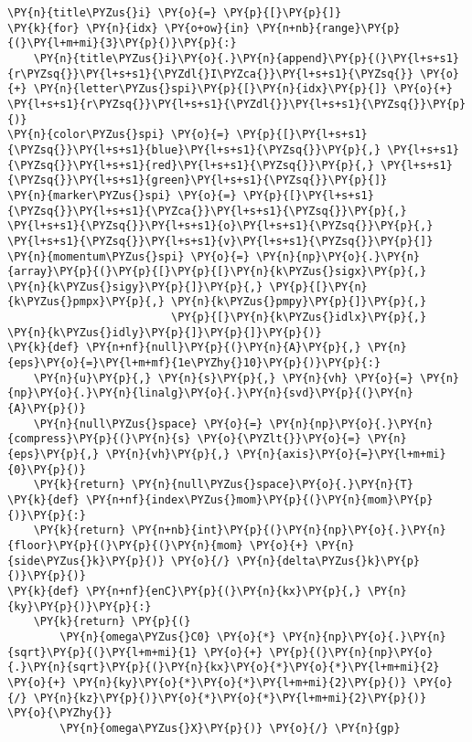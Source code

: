 \begin{Verbatim}[commandchars=\\\{\}]
\PY{n}{title\PYZus{}i} \PY{o}{=} \PY{p}{[}\PY{p}{]}
\PY{k}{for} \PY{n}{idx} \PY{o+ow}{in} \PY{n+nb}{range}\PY{p}{(}\PY{l+m+mi}{3}\PY{p}{)}\PY{p}{:}
    \PY{n}{title\PYZus{}i}\PY{o}{.}\PY{n}{append}\PY{p}{(}\PY{l+s+s1}{r\PYZsq{}}\PY{l+s+s1}{\PYZdl{}I\PYZca{}}\PY{l+s+s1}{\PYZsq{}} \PY{o}{+} \PY{n}{letter\PYZus{}spi}\PY{p}{[}\PY{n}{idx}\PY{p}{]} \PY{o}{+} \PY{l+s+s1}{r\PYZsq{}}\PY{l+s+s1}{\PYZdl{}}\PY{l+s+s1}{\PYZsq{}}\PY{p}{)}
\PY{n}{color\PYZus{}spi} \PY{o}{=} \PY{p}{[}\PY{l+s+s1}{\PYZsq{}}\PY{l+s+s1}{blue}\PY{l+s+s1}{\PYZsq{}}\PY{p}{,} \PY{l+s+s1}{\PYZsq{}}\PY{l+s+s1}{red}\PY{l+s+s1}{\PYZsq{}}\PY{p}{,} \PY{l+s+s1}{\PYZsq{}}\PY{l+s+s1}{green}\PY{l+s+s1}{\PYZsq{}}\PY{p}{]}
\PY{n}{marker\PYZus{}spi} \PY{o}{=} \PY{p}{[}\PY{l+s+s1}{\PYZsq{}}\PY{l+s+s1}{\PYZca{}}\PY{l+s+s1}{\PYZsq{}}\PY{p}{,} \PY{l+s+s1}{\PYZsq{}}\PY{l+s+s1}{o}\PY{l+s+s1}{\PYZsq{}}\PY{p}{,} \PY{l+s+s1}{\PYZsq{}}\PY{l+s+s1}{v}\PY{l+s+s1}{\PYZsq{}}\PY{p}{]}
\PY{n}{momentum\PYZus{}spi} \PY{o}{=} \PY{n}{np}\PY{o}{.}\PY{n}{array}\PY{p}{(}\PY{p}{[}\PY{p}{[}\PY{n}{k\PYZus{}sigx}\PY{p}{,} \PY{n}{k\PYZus{}sigy}\PY{p}{]}\PY{p}{,} \PY{p}{[}\PY{n}{k\PYZus{}pmpx}\PY{p}{,} \PY{n}{k\PYZus{}pmpy}\PY{p}{]}\PY{p}{,}
                         \PY{p}{[}\PY{n}{k\PYZus{}idlx}\PY{p}{,} \PY{n}{k\PYZus{}idly}\PY{p}{]}\PY{p}{]}\PY{p}{)}
\PY{k}{def} \PY{n+nf}{null}\PY{p}{(}\PY{n}{A}\PY{p}{,} \PY{n}{eps}\PY{o}{=}\PY{l+m+mf}{1e\PYZhy{}10}\PY{p}{)}\PY{p}{:}
    \PY{n}{u}\PY{p}{,} \PY{n}{s}\PY{p}{,} \PY{n}{vh} \PY{o}{=} \PY{n}{np}\PY{o}{.}\PY{n}{linalg}\PY{o}{.}\PY{n}{svd}\PY{p}{(}\PY{n}{A}\PY{p}{)}
    \PY{n}{null\PYZus{}space} \PY{o}{=} \PY{n}{np}\PY{o}{.}\PY{n}{compress}\PY{p}{(}\PY{n}{s} \PY{o}{\PYZlt{}}\PY{o}{=} \PY{n}{eps}\PY{p}{,} \PY{n}{vh}\PY{p}{,} \PY{n}{axis}\PY{o}{=}\PY{l+m+mi}{0}\PY{p}{)}
    \PY{k}{return} \PY{n}{null\PYZus{}space}\PY{o}{.}\PY{n}{T}
\PY{k}{def} \PY{n+nf}{index\PYZus{}mom}\PY{p}{(}\PY{n}{mom}\PY{p}{)}\PY{p}{:}
    \PY{k}{return} \PY{n+nb}{int}\PY{p}{(}\PY{n}{np}\PY{o}{.}\PY{n}{floor}\PY{p}{(}\PY{p}{(}\PY{n}{mom} \PY{o}{+} \PY{n}{side\PYZus{}k}\PY{p}{)} \PY{o}{/} \PY{n}{delta\PYZus{}k}\PY{p}{)}\PY{p}{)}
\PY{k}{def} \PY{n+nf}{enC}\PY{p}{(}\PY{n}{kx}\PY{p}{,} \PY{n}{ky}\PY{p}{)}\PY{p}{:}
    \PY{k}{return} \PY{p}{(}
        \PY{n}{omega\PYZus{}C0} \PY{o}{*} \PY{n}{np}\PY{o}{.}\PY{n}{sqrt}\PY{p}{(}\PY{l+m+mi}{1} \PY{o}{+} \PY{p}{(}\PY{n}{np}\PY{o}{.}\PY{n}{sqrt}\PY{p}{(}\PY{n}{kx}\PY{o}{*}\PY{o}{*}\PY{l+m+mi}{2} \PY{o}{+} \PY{n}{ky}\PY{o}{*}\PY{o}{*}\PY{l+m+mi}{2}\PY{p}{)} \PY{o}{/} \PY{n}{kz}\PY{p}{)}\PY{o}{*}\PY{o}{*}\PY{l+m+mi}{2}\PY{p}{)} \PY{o}{\PYZhy{}}
        \PY{n}{omega\PYZus{}X}\PY{p}{)} \PY{o}{/} \PY{n}{gp}

\end{Verbatim}
